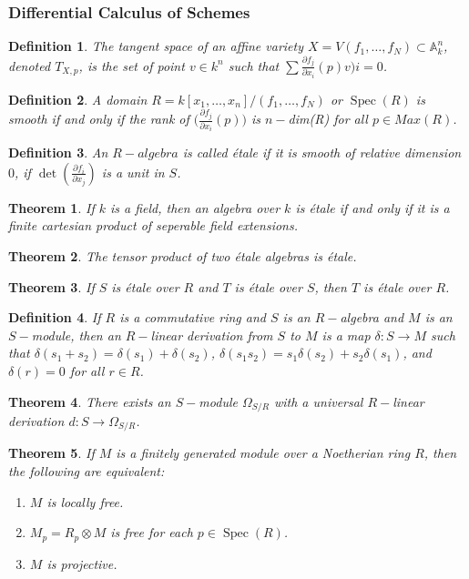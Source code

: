 \documentclass[oneside]{book}
\theoremstyle{mystyle}
\newtheorem{theorem}{Theorem}[section]
\newtheorem{definition}{Definition}[section]
\DeclareMathOperator{\Spec}{Spec}
\begin{document}
\subsubsection{Differential Calculus of Schemes}
\begin{definition}
The tangent space of an affine variety $X = V(f_1,\hdots, f_N)\subset \mathbb{A}_{k}^n$, denoted $T_{X,p}$, is the set of point $v\in k^n$ such that $\sum \frac{\partial f_j}{\partial x_i}(p)v)i = 0$.
\end{definition}
\begin{definition}
A domain $R = k[x_1,\hdots ,x_n]/(f_1,\hdots, f_N)$ or $\Spec(R)$ is smooth if and only if the rank of $\big(\frac{\partial f_j}{\partial x_i}(p)\big)$ is $n-$dim(R) for all $p\in Max(R)$. 
\end{definition}
\begin{definition}
An $R-algebra$ is called \'{e}tale if it is smooth of relative dimension $0$, if $\det(\frac{\partial f_i}{\partial x_j})$ is a unit in $S$.
\end{definition}
\begin{theorem}
If $k$ is a field, then an algebra over $k$ is \'{e}tale if and only if it is a finite cartesian product of seperable field extensions. 
\end{theorem}
\begin{theorem}
The tensor product of two \'{e}tale algebras is \'{e}tale.
\end{theorem}
\begin{theorem}
If $S$ is \'{e}tale over $R$ and $T$ is \'{e}tale over $S$, then $T$ is \'{e}tale over $R$.
\end{theorem}
\begin{definition}
If $R$ is a commutative ring and $S$ is an $R-$algebra and $M$ is an $S-$module, then an $R-$linear derivation from $S$ to $M$ is a map $\delta:S\rightarrow M$ such that $\delta(s_1+s_2) = \delta(s_1)+\delta(s_2)$, $\delta(s_1 s_2) = s_1 \delta(s_2)+s_2\delta(s_1)$, and $\delta(r) = 0$ for all $r\in R$.
\end{definition}
\begin{theorem}
There exists an $S-$module $\Omega_{S/R}$ with a universal $R-$linear derivation $d:S\rightarrow \Omega_{S/R}$.
\end{theorem}
\begin{theorem}
If $M$ is a finitely generated module over a Noetherian ring $R$, then the following are equivalent:
\begin{enumerate}
    \item $M$ is locally free.
    \item $M_p = R_p \otimes M$ is free for each $p \in \Spec(R)$.
    \item $M$ is projective.
\end{enumerate}
\end{theorem}
\end{document}
